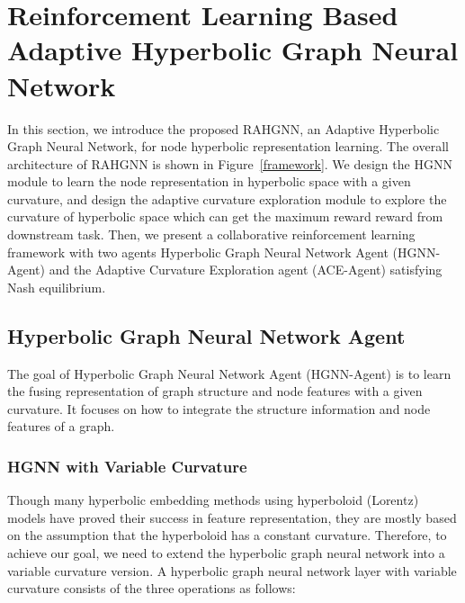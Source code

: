\section{Reinforcement Learning Based Adaptive Hyperbolic Graph Neural Network}\label{section 4}

In this section, we introduce the proposed RAHGNN, an Adaptive Hyperbolic Graph Neural Network, for node hyperbolic representation learning. 
The overall architecture of RAHGNN is shown in Figure~\ref{framework}. 
We design the HGNN module to learn the node representation in hyperbolic space with a given curvature, and design the adaptive curvature exploration module to explore the curvature of hyperbolic space which can get the maximum reward reward from downstream task.
Then, we present a collaborative reinforcement learning framework with two agents  Hyperbolic Graph Neural Network Agent (HGNN-Agent) and the Adaptive Curvature Exploration agent (ACE-Agent) satisfying Nash equilibrium. 

\subsection{Hyperbolic Graph Neural Network Agent}
The goal of Hyperbolic Graph Neural Network Agent (HGNN-Agent) is to learn the fusing representation of graph structure and node features with a given curvature. 
It focuses on how to integrate the structure information and node features of a graph. 

\subsubsection{HGNN with Variable Curvature}
Though many hyperbolic embedding methods using hyperboloid (Lorentz) models have proved their success in feature representation, they are mostly based on the assumption that the hyperboloid has a constant curvature. 
Therefore, to achieve our goal, we need to extend the hyperbolic graph neural network into a variable curvature version.
A hyperbolic graph neural network layer with variable curvature consists of the three operations as follows:

